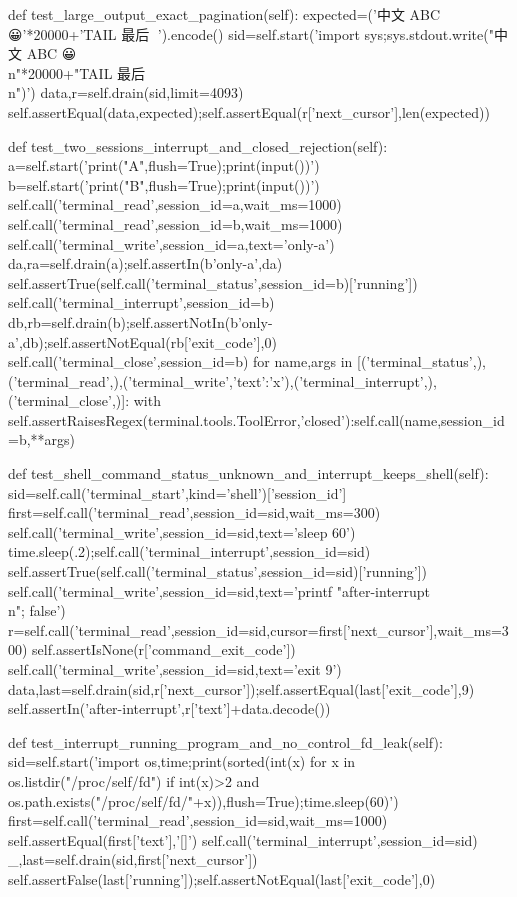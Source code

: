     def test_large_output_exact_pagination(self):
        expected=('中文 ABC 😀\n'*20000+'TAIL 最后 🧸\n').encode()
        sid=self.start('import sys;sys.stdout.write("中文 ABC 😀\\n"*20000+"TAIL 最后 🧸\\n")')
        data,r=self.drain(sid,limit=4093)
        self.assertEqual(data,expected);self.assertEqual(r['next_cursor'],len(expected))

    def test_two_sessions_interrupt_and_closed_rejection(self):
        a=self.start('print("A",flush=True);print(input())')
        b=self.start('print("B",flush=True);print(input())')
        self.call('terminal_read',session_id=a,wait_ms=1000)
        self.call('terminal_read',session_id=b,wait_ms=1000)
        self.call('terminal_write',session_id=a,text='only-a\n')
        da,ra=self.drain(a);self.assertIn(b'only-a',da)
        self.assertTrue(self.call('terminal_status',session_id=b)['running'])
        self.call('terminal_interrupt',session_id=b)
        db,rb=self.drain(b);self.assertNotIn(b'only-a',db);self.assertNotEqual(rb['exit_code'],0)
        self.call('terminal_close',session_id=b)
        for name,args in [('terminal_status',{}),('terminal_read',{}),('terminal_write',{'text':'x'}),('terminal_interrupt',{}),('terminal_close',{})]:
            with self.assertRaisesRegex(terminal.tools.ToolError,'closed'):self.call(name,session_id=b,**args)

    def test_shell_command_status_unknown_and_interrupt_keeps_shell(self):
        sid=self.call('terminal_start',kind='shell')['session_id']
        first=self.call('terminal_read',session_id=sid,wait_ms=300)
        self.call('terminal_write',session_id=sid,text='sleep 60\n')
        time.sleep(.2);self.call('terminal_interrupt',session_id=sid)
        self.assertTrue(self.call('terminal_status',session_id=sid)['running'])
        self.call('terminal_write',session_id=sid,text='printf "after-interrupt\\n"; false\n')
        r=self.call('terminal_read',session_id=sid,cursor=first['next_cursor'],wait_ms=300)
        self.assertIsNone(r['command_exit_code'])
        self.call('terminal_write',session_id=sid,text='exit 9\n')
        data,last=self.drain(sid,r['next_cursor']);self.assertEqual(last['exit_code'],9)
        self.assertIn('after-interrupt',r['text']+data.decode())

    def test_interrupt_running_program_and_no_control_fd_leak(self):
        sid=self.start('import os,time;print(sorted(int(x) for x in os.listdir("/proc/self/fd") if int(x)>2 and os.path.exists("/proc/self/fd/"+x)),flush=True);time.sleep(60)')
        first=self.call('terminal_read',session_id=sid,wait_ms=1000)
        self.assertEqual(first['text'],'[]\n')
        self.call('terminal_interrupt',session_id=sid)
        _,last=self.drain(sid,first['next_cursor'])
        self.assertFalse(last['running']);self.assertNotEqual(last['exit_code'],0)

